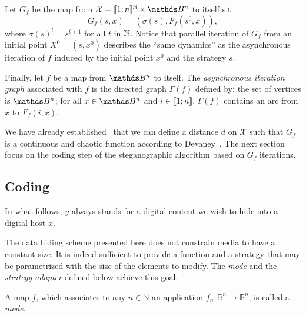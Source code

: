\documentclass{comjnl}
\begin{document}
Let $G_f$ be the map from $\mathcal{X}= \llbracket1;n\rrbracket^\Nats\times\Bool^n$ to 
itself s.t.
\[
G_f(s,x)=(\sigma(s),F_f(s^0,x)),
\] 
where $\sigma(s)^t=s^{t+1}$ for all $t$ in $\mathbb{N}$. 
Notice that parallel iteration of $G_f$ from an initial point
$X^0=(s,x^0)$ describes the ``same dynamics'' as the asynchronous
iteration of $f$ induced by the initial point $x^0$ and the strategy
$s$.


Finally, let $f$ be a map from $\Bool^n$ to itself. The
{\emph{asynchronous iteration graph}} associated with $f$ is the
directed graph $\Gamma(f)$ defined by: the set of vertices is
$\Bool^n$; for all $x\in\Bool^n$ and $i\in \llbracket1;n\rrbracket$,
$\Gamma(f)$ contains an arc from $x$ to $F_f(i,x)$. 























We have already established~\cite{GuyeuxThese10} that we can define a
distance $d$ on $\mathcal{X}$ such that 
$G_f$ is a continuous and chaotic function according to 
Devaney~\cite{Devaney}.
The next section focus on  the coding step of  the steganographic algorithm
based on $G_f$ iterations. 

\subsection{Coding}\label{sub:wmcoding}
In what follows, $y$ always stands  
for a digital content we wish to hide into a digital host $x$.


The data hiding scheme presented here does not constrain media to have 
a constant size. It is indeed sufficient to provide a function and a strategy 
that may be  parametrized with the size of the elements to modify. 
The \emph{mode} and the \emph{strategy-adapter} defined below achieve 
this goal.  

\begin{definition}[Mode]
\label{def:mode}
A map $f$, which associates to any $n \in \mathds{N}$ an application 
$f_n : \mathds{B}^n \rightarrow \mathds{B}^n$, is called a \emph{mode}.
\end{definition}
\end{document}

